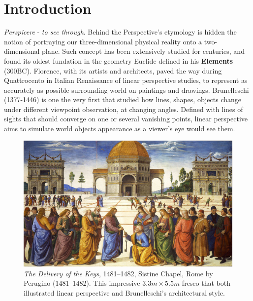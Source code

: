 \chapter{Introduction}
\label{chapter:introduction}

{}


\emph{Perspicere} - \textit{to see through}. Behind the Perspective's etymology is hidden the notion of portraying our three-dimensional physical reality onto a two-dimensional plane. Such concept has been extensively studied for centuries, and found its oldest fundation in the geometry Euclide defined in his \textbf{Elements} (300BC). Florence, with its artists and architects, paved the way during Quattrocento in Italian Renaissance of linear perspective studies, to represent as accurately as possible surrounding world on paintings and drawings. Brunelleschi (1377-1446) is one the very first that studied how lines, shapes, objects change under different viewpoint observation, at changing angles. Defined with lines of sights that should converge on one or several vanishing points, linear perspective aims to simulate world objects appearance as a viewer's eye would see them.

\begin{figure}[h!]
      \begin{center}
      \includegraphics[width=.8\textwidth]{images/introduction/perugino.jpg}
      \end{center}
      \caption{\textit{The Delivery of the Keys}, 1481–1482, Sistine Chapel, Rome by Perugino (1481–1482). This impressive $3.3m \times 5.5m$ fresco that both illustrated linear perspective and Brunelleschi's architectural style.}
      \label{fig:intro_perugino}
\end{figure}

